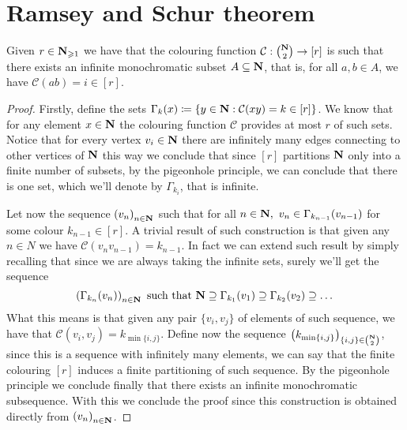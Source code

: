 \section{Ramsey and Schur theorem}

\begin{theorem}\label{ramseyThmGraphs}
Given \(r \in \mathbf{N}_{\geqslant 1}\) we have that the colouring function
\(\mathcal{C}: \binom{\mathbf{N}}{2} \to [r]\) is such that there exists an
infinite monochromatic subset \(A \subseteq \mathbf{N}\), that is, for all \(a, b
\in A\), we have \(\mathcal{C}(ab) = i \in [r]\).
\end{theorem}

\begin{proof}
Firstly, define the sets \(\Gamma_k(x) \coloneq \{y \in \mathbf{N} : \mathcal{C}(x
y) = k \in [r]\}\). We know that for any element \(x \in \mathbf{N}\) the
colouring function \(\mathcal{C}\) provides at most \(r\) of such sets. Notice
that for every vertex \(v_i \in \mathbf{N}\) there are infinitely many edges
connecting to other vertices of \(\mathbf{N}\) this way we conclude that
since \([r]\) partitions \(\mathbf{N}\) only into a finite number of subsets,
by the pigeonhole principle, we can conclude that there is one set, which
we'll denote by \(\Gamma_{k_i}\), that is infinite.

Let now the sequence \(\left( v_n \right)_{n \in \mathbf{N}}\) such that for all
\(n \in \N,\ v_n \in \Gamma_{k_{n-1}}(v_{n-1})\) for some
colour \(k_{n-1} \in [r]\). A trivial result of such construction is that
given any \(n \in N\) we have \(\mathcal{C}(v_n v_{n-1}) = k_{n-1}\). In fact
we can extend such result by simply recalling that since we are always taking
the infinite sets, surely we'll get the sequence
\[
    \left( \Gamma_{k_{n}}(v_n) \right)_{n \in \mathbf{N}} \text{ such that }
    \mathbf{N} \supseteq \Gamma_{k_{1}}(v_1) \supseteq  \Gamma_{k_{2}}(v_2)
    \supseteq \dots
\]
What this means is that given any pair \(\{v_i, v_j\}\) of elements of such
sequence, we have that \(\mathcal{C}(v_i, v_j) = k_{\min \{i, j\}}\). Define
now the sequence \(\left( k_{\min \{i, j\}} \right)_{\{i, j\} \in
\binom{\mathbf{N}}{2}}\), since this is a sequence with infinitely many
elements, we can say that the finite colouring \([r]\) induces a finite
partitioning of such sequence. By the pigeonhole principle we conclude
finally that there exists an infinite monochromatic subsequence. With this we
conclude the proof since this construction is obtained directly from \(\left(
v_n \right)_{n \in \mathbf{N}}\).
\end{proof}


